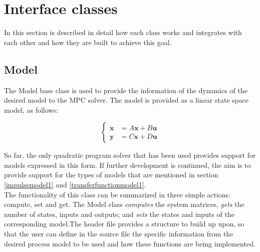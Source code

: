 \section{Interface classes}

In this section is described in detail how each class works and integrates with each other and how they are built to achieve this goal. 

\subsection{Model}

The Model base class is used to provide the information of the dynamics of the desired model to the MPC solver. The model is provided as a linear state space model, as follows:

\begin{equation} \label{eq:model_representation}
\begin{cases}
\dot{\mathbf{x}} &= A\mathbf{x} + B\mathbf{u} \\
\mathbf{y} &= C\mathbf{x} + D\mathbf{u}
\end{cases}
\end{equation} 

So far, the only quadratic program solver that has been used provides support for models expressed in this form. If further development is continued, the aim is to provide support for the types of models that are mentioned in section \ref{impulsemodel1} and \ref{transferfunctionmodel1}.\\

The functionality of this class can be summarized in three simple actions: compute, set and get. The Model class \emph{computes} the system matrices, \emph{gets} the number of states, inputs and outputs; and \emph{sets} the states and inputs of the corresponding model.The header file provides a structure to build up upon, so that the user can define in the source file the specific information from the desired process model to be used and how these functions are being implemented. 

